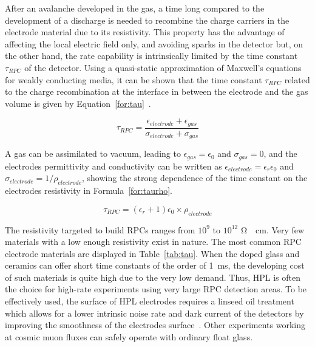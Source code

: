 	After an avalanche developed in the gas, a time long compared to the development of a discharge is needed to recombine the charge carriers in the electrode material due to its resistivity. This property has the advantage of affecting the local electric field only, and avoiding sparks in the detector but, on the other hand, the rate capability is intrinsically limited by the time constant $\tau_{RPC}$ of the detector. Using a quasi-static approximation of Maxwell’s equations for weakly conducting media, it can be shown that the time constant $\tau_{RPC}$ related to the charge recombination at the interface in between the electrode and the gas volume is given by Equation~\ref{for:tau}~\cite{RIEGLER2002}.
	
	\begin{equation}
		\label{for:tau}
		\tau_{RPC} = \frac{\epsilon_{electrode}+\epsilon_{gas}}{\sigma_{electrode}+\sigma_{gas}}
	\end{equation}
	
	A gas can be assimilated to vacuum, leading to $\epsilon_{gas} = \epsilon_0$ and $\sigma_{gas} = 0$, and the electrodes permittivity and conductivity can be written as $\epsilon_{electrode} = \epsilon_r\epsilon_0$ and $\sigma_{electrode} = 1/\rho_{electrode}$, showing the strong dependence of the time constant on the electrodes resistivity in Formula~\ref{for:taurho}.
	
	\begin{equation}
		\label{for:taurho}
		\tau_{RPC} = (\epsilon_r + 1)\epsilon_0\times\rho_{electrode}
	\end{equation}
	
	The resistivity targeted to build RPCs ranges from $10^9$ to $10^{12}$ \si{\ohm\cdot cm}. Very few materials with a low enough resistivity exist in nature. The most common RPC electrode materials are displayed in Table~\ref{tab:tau}. When the doped glass and ceramics can offer short time constants of the order of \SI{1}{ms}, the developing cost of such materials is quite high due to the very low demand. Thus, \acf{HPL} is often the choice for high-rate experiments using very large RPC detection areas. To be effectively used, the surface of HPL electrodes requires a linseed oil treatment which allows for a lower intrinsic noise rate and dark current of the detectors by improving the smoothness of the electrodes surface~\cite{ABBRESCIA1997OIL}. Other experiments working at cosmic muon fluxes can safely operate with ordinary float glass.
	
